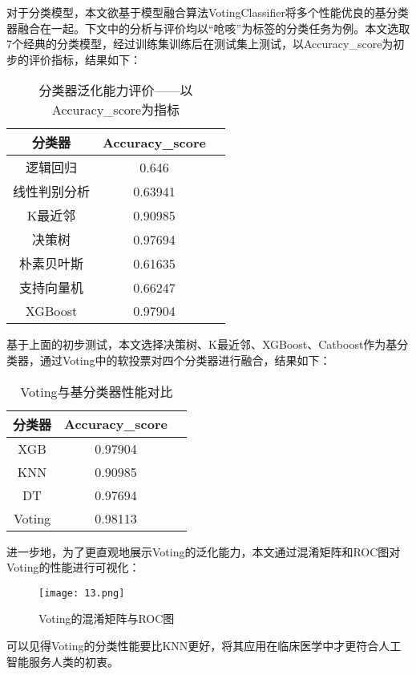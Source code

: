 对于分类模型，本文欲基于模型融合算法VotingClassifier将多个性能优良的基分类器融合在一起。下文中的分析与评价均以“呛咳”为标签的分类任务为例。本文选取7个经典的分类模型，经过训练集训练后在测试集上测试，以Accuracy\_score为初步的评价指标，结果如下：

\begin{table}[H]
    \centering  
    \caption{分类器泛化能力评价——以Accuracy\_score为指标}
    \begin{tabular}{c c c}  
    	\toprule[1.5pt]  
    	分类器        & Accuracy\_score \\  
    	\midrule[1pt]    
    	逻辑回归      & 0.646 \\ 
    	线性判别分析  & 0.63941 \\ 
    	K最近邻       &  0.90985 \\ 
    	决策树        & 0.97694 \\ 
    	朴素贝叶斯    &  0.61635 \\ 
    	支持向量机    & 0.66247 \\ 
    	XGBoost       &  0.97904 \\ 
    	\toprule[1.5pt]  
    \end{tabular}  
\end{table} 

基于上面的初步测试，本文选择决策树、K最近邻、XGBoost、Catboost作为基分类器，通过Voting中的软投票对四个分类器进行融合，结果如下：

\begin{table}[H]
    \centering  
    \caption{Voting与基分类器性能对比}
    \begin{tabular}{c c c}  
    	\toprule[1.5pt]  
    	分类器        & Accuracy\_score \\  
    	\midrule[1pt]    
    	XGB & 0.97904 \\
        KNN & 0.90985 \\
        DT  & 0.97694 \\
        Voting & 0.98113 \\
    	\toprule[1.5pt]  
    \end{tabular}  
\end{table} 

进一步地，为了更直观地展示Voting的泛化能力，本文通过混淆矩阵和ROC图对Voting的性能进行可视化：

\begin{figure}[H] %
	\centering %
	\texttt{[image: 13.png]} 
	\caption{Voting的混淆矩阵与ROC图} 
	\label{Fig.main13} 
\end{figure}

可以见得Voting的分类性能要比KNN更好，将其应用在临床医学中才更符合人工智能服务人类的初衷。












